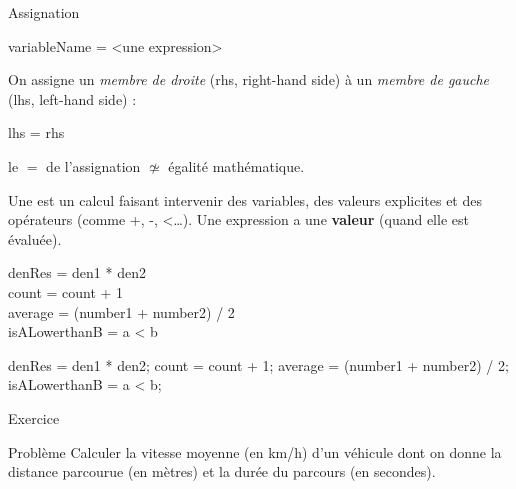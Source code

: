 \begin{hideedit}
\begin{frame}[fragile]{Assignation}
  \begin{java}
variableName = <une expression>
  \end{java}
\end{frame}

\begin{frame}[fragile]
  On assigne un \emph{membre de droite} (rhs, right-hand side) à un
  \emph{membre de gauche} (lhs, left-hand side) :
  \begin{java}
lhs = rhs
  \end{java}

  \pause
  \bcattention le \(=\) de l'assignation \(\not\simeq\) égalité mathématique.
\end{frame}

\begin{frame}[fragile]
  \begin{definition}[Expression]
    Une  est un calcul faisant
    intervenir des variables, des valeurs explicites et des opérateurs
    (comme +, -, <\dots).  Une expression a une \textbf{valeur} (quand elle est
    évaluée).
  \end{definition}

  \pause
  \begin{langagenaturel}
     denRes = den1 * den2\\
     count = count + 1\\
     average = (number1 + number2) / 2\\
     isALowerthanB = a < b
  \end{langagenaturel}

  \begin{java}
denRes = den1 * den2;
count = count + 1;
average = (number1 + number2) / 2;
isALowerthanB = a < b;
  \end{java}
\end{frame}

\begin{frame}{Exercice}
  \begin{block}{Problème}
    Calculer la vitesse moyenne (en km/h) d’un véhicule dont on donne la
    distance parcourue (en mètres) et la durée du parcours (en secondes).
  \end{block}


\end{frame}
\end{hideedit}
